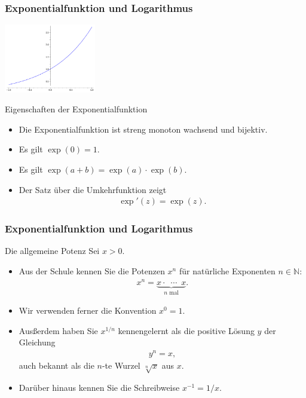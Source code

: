 \documentclass{beamer}
\newcommand\NN{\mathbb N}
\renewcommand{\oe}{\"o}
\newcommand{\ue}{\"u}
\newcommand{\mytitle}{Exponentialfunktion und Logarithmus}
\begin{document}
\begin{frame}\frametitle{\mytitle}
	\hfill\includegraphics[height=30mm]{pics/plot_exp.pdf}
	\begin{block}{Eigenschaften der Exponentialfunktion}
	\begin{itemize}
	\item Die Exponentialfunktion ist streng monoton wachsend und bijektiv.
	\item Es gilt $\exp(0)=1$.
	\item Es gilt $\exp(a+b)=\exp(a)\cdot\exp(b)$.
	\item Der Satz \ue ber die Umkehrfunktion zeigt
		\begin{align*}
			\exp'(z)=\exp(z).
		\end{align*}
	\end{itemize}
	\end{block}
\end{frame}

\begin{frame}\frametitle{\mytitle}
	\begin{block}{Die allgemeine Potenz}
		Sei $x>0$.
	\begin{itemize}
		\item Aus der Schule kennen Sie die Potenzen $x^n$ f\ue r nat\ue rliche Exponenten $n\in\NN$:
			\begin{align*}
				x^n=\underbrace{x\cdot\enspace\cdots\enspace x}_{\mbox{$n$ mal}}.
			\end{align*}
		\item Wir verwenden ferner die Konvention $x^0=1$.
		\item Aus\ss erdem haben Sie $x^{1/n}$ kennengelernt als die positive L\oe sung $y$ der Gleichung
			\begin{align*}
			y^n=x,
			\end{align*}
			auch bekannt als die \alert{$n$-te Wurzel $\sqrt[n]x$ aus $x$}.
		\item Dar\ue ber hinaus kennen Sie die Schreibweise $x^{-1}=1/x$.
	\end{itemize}
	\end{block}
\end{frame}
\end{document}
